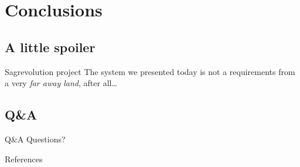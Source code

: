 

\section[Conclusions]{Conclusions}

\subsection{A little spoiler}

\begin{frame}{Sagrevolution project}
	The system we presented today is not a requirements from a very
	\textit{far away land}, after all\dots
\end{frame}

\subsection{Q\&A}

\begin{frame}{Q\&A}
	Questions?
\end{frame}

\begin{frame}{References}
	\printbibliography
\end{frame}